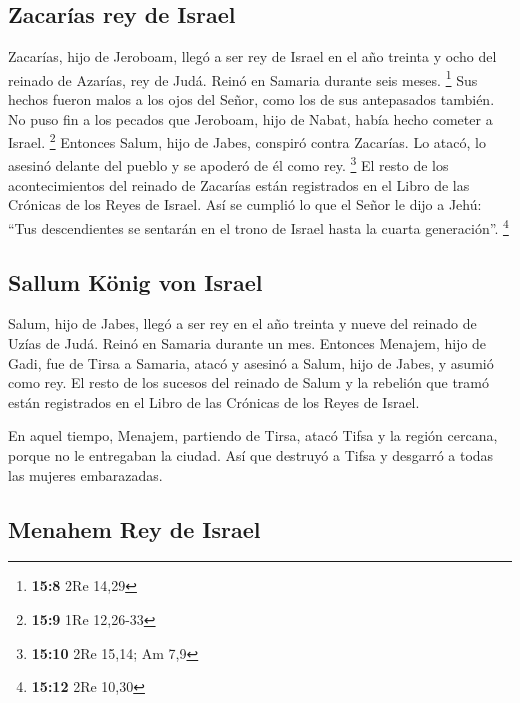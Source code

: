 \hypertarget{zacaruxedas-rey-de-israel}{%
\subsection{Zacarías rey de Israel}\label{zacaruxedas-rey-de-israel}}

 Zacarías, hijo de Jeroboam, llegó a ser rey de Israel en
el año treinta y ocho del reinado de Azarías, rey de Judá. Reinó en
Samaria durante seis meses. \footnote{\textbf{15:8} 2Re 14,29}
 Sus hechos fueron malos a los ojos del Señor, como los de
sus antepasados también. No puso fin a los pecados que Jeroboam, hijo de
Nabat, había hecho cometer a Israel. \footnote{\textbf{15:9} 1Re
  12,26-33}  Entonces Salum, hijo de Jabes, conspiró
contra Zacarías. Lo atacó, lo asesinó delante del pueblo y se apoderó de
él como rey. \footnote{\textbf{15:10} 2Re 15,14; Am 7,9} 
El resto de los acontecimientos del reinado de Zacarías están
registrados en el Libro de las Crónicas de los Reyes de Israel.
 Así se cumplió lo que el Señor le dijo a Jehú: ``Tus
descendientes se sentarán en el trono de Israel hasta la cuarta
generación''. \footnote{\textbf{15:12} 2Re 10,30}

\hypertarget{sallum-kuxf6nig-von-israel}{%
\subsection{Sallum König von Israel}\label{sallum-kuxf6nig-von-israel}}

 Salum, hijo de Jabes, llegó a ser rey en el año treinta
y nueve del reinado de Uzías de Judá. Reinó en Samaria durante un mes.
 Entonces Menajem, hijo de Gadi, fue de Tirsa a Samaria,
atacó y asesinó a Salum, hijo de Jabes, y asumió como rey.
 El resto de los sucesos del reinado de Salum y la
rebelión que tramó están registrados en el Libro de las Crónicas de los
Reyes de Israel.

 En aquel tiempo, Menajem, partiendo de Tirsa, atacó
Tifsa y la región cercana, porque no le entregaban la ciudad. Así que
destruyó a Tifsa y desgarró a todas las mujeres embarazadas.

\hypertarget{menahem-rey-de-israel}{%
\subsection{Menahem Rey de Israel}\label{menahem-rey-de-israel}}

